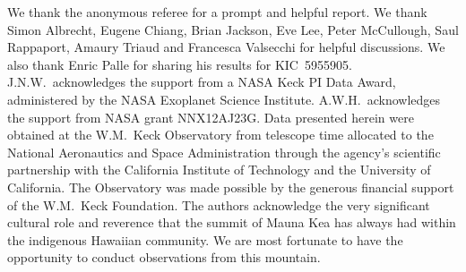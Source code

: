\documentclass[twocolumn]{aastex6}
\begin{document}
\acknowledgements We thank the anonymous referee for a prompt and
helpful report. We thank Simon Albrecht, Eugene Chiang, Brian Jackson,
Eve Lee, Peter McCullough, Saul Rappaport, Amaury Triaud and Francesca
Valsecchi for helpful discussions. We also thank Enric Palle for
sharing his results for KIC~5955905. J.N.W.\ acknowledges the support
from a NASA Keck PI Data Award, administered by the NASA Exoplanet
Science Institute. A.W.H.\ acknowledges the support from NASA grant
NNX12AJ23G. Data presented herein were obtained at the W.M.\ Keck
Observatory from telescope time allocated to the National Aeronautics
and Space Administration through the agency's scientific partnership
with the California Institute of Technology and the University of
California. The Observatory was made possible by the generous
financial support of the W.M.\ Keck Foundation. The authors
acknowledge the very significant cultural role and reverence that the
summit of Mauna Kea has always had within the indigenous Hawaiian
community. We are most fortunate to have the opportunity to conduct
observations from this mountain.



\end{document}
